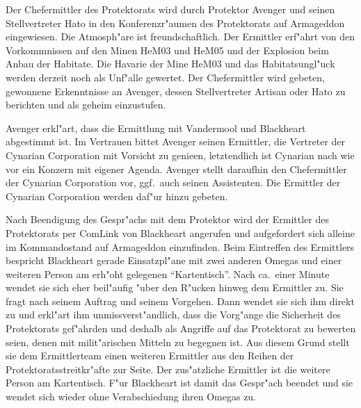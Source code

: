 Der Chefermittler des Protektorats wird durch Protektor Avenger und seinen Stellvertreter Hato in den Konferenzr"aumen des Protektorats auf Armageddon eingewiesen. Die Atmosph"are ist freundschaftlich. Der Ermittler erf"ahrt von den Vorkommnissen auf den Minen HeM03 und HeM05 und der Explosion beim Anbau der Habitate. Die Havarie der Mine HeM03 und das Habitatsungl"uck werden derzeit noch als Unf"alle gewertet. Der Chefermittler wird gebeten, gewonnene Erkenntnisse an Avenger, dessen Stellvertreter Artisan oder Hato zu berichten und als geheim einzustufen.

Avenger erkl"art, dass die Ermittlung mit Vandermool und Blackheart abgestimmt ist. Im Vertrauen bittet Avenger seinen Ermittler, die Vertreter der Cynarian Corporation mit Vorsicht zu genie\3en, letztendlich ist Cynarian nach wie vor ein Konzern mit eigener Agenda. Avenger stellt daraufhin den Chefermittler der Cynarian Corporation vor, ggf.~auch seinen Assistenten. Die Ermittler der Cynarian Corporation werden daf"ur hinzu gebeten.

Nach Beendigung des Gespr"achs mit dem Protektor wird der Ermittler des Protektorats per ComLink von Blackheart angerufen und aufgefordert sich alleine im Kommandostand auf Armageddon einzufinden. Beim Eintreffen des Ermittlers bespricht Blackheart gerade Einsatzpl"ane mit zwei anderen Omegas und einer weiteren Person am erh"oht gelegenen "`Kartentisch"'. Nach ca.~einer Minute  wendet sie sich eher beil"aufig "uber den R"ucken hinweg dem Ermittler zu. Sie fragt nach seinem Auftrag und seinem Vorgehen. Dann wendet sie sich ihm direkt zu und erkl"art ihm unmissverst"andlich, dass die Vorg"ange die Sicherheit des Protektorats gef"ahrden und deshalb als Angriffe auf das Protektorat zu bewerten seien, denen mit milit"arischen Mitteln zu begegnen ist. Aus diesem Grund stellt sie dem Ermittlerteam einen weiteren Ermittler aus den Reihen der Protektoratsstreitkr"afte zur Seite. Der zus"atzliche Ermittler ist die weitere Person am Kartentisch. F"ur Blackheart ist damit das Gespr"ach beendet und sie wendet sich wieder ohne Verabschiedung ihren Omegas zu.

